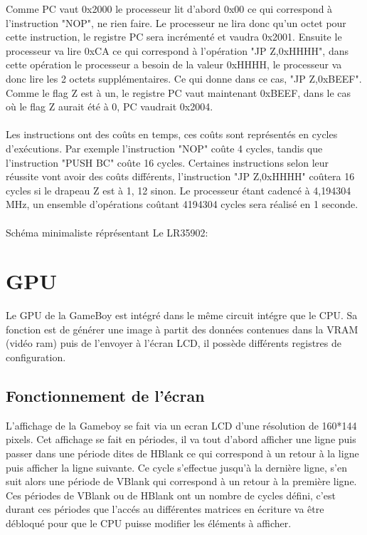 \documentclass{report}
\begin{document}
Comme PC vaut 0x2000 le processeur lit d'abord 0x00 ce qui correspond à l'instruction "NOP", ne rien faire. 
Le processeur ne lira donc qu'un octet pour cette instruction, le registre PC sera incrémenté et vaudra 0x2001.
Ensuite le processeur va lire 0xCA ce qui correspond à l'opération "JP Z,0xHHHH", dans cette opération le processeur a besoin de la valeur 0xHHHH, le processeur va donc lire les 2 octets supplémentaires. Ce qui donne dans ce cas, "JP Z,0xBEEF".
Comme le flag Z est à un, le registre PC vaut maintenant 0xBEEF, dans le cas où le flag Z aurait été à 0, PC vaudrait 0x2004.\\\\
Les instructions ont des coûts en temps, ces coûts sont représentés en cycles d'exécutions.
Par exemple l'instruction "NOP" coûte 4 cycles, tandis que l'instruction "PUSH BC" coûte 16 cycles.
Certaines instructions selon leur réussite vont avoir des coûts différents, l'instruction "JP Z,0xHHHH" coûtera 16 cycles si le drapeau Z est à 1, 12 sinon.
Le processeur étant cadencé à 4,194304 MHz, un ensemble d'opérations coûtant 4194304 cycles sera réalisé en 1 seconde.
\\\\
Schéma minimaliste réprésentant Le LR35902:

\section{GPU}

Le GPU de la GameBoy est intégré dans le même circuit intégre que le CPU. Sa fonction est de générer une image à partit des données contenues dans la VRAM (vidéo ram) puis de l'envoyer à l'écran LCD, il possède différents registres de configuration.

\subsection{Fonctionnement de l'écran}

L'affichage de la Gameboy se fait via un ecran LCD d'une résolution de 160*144 pixels. Cet affichage se fait en périodes, il va tout d'abord afficher une ligne puis passer dans une période dites de HBlank ce qui correspond à un retour à la ligne puis afficher la ligne suivante. Ce cycle s'effectue jusqu'à la dernière ligne, s'en suit alors une période de VBlank qui correspond à un retour à la première ligne.
Ces périodes de VBlank ou de HBlank ont un nombre de cycles défini, c'est
durant ces périodes que l'accés au différentes matrices en écriture va être
débloqué pour que le CPU puisse modifier les éléments à afficher.\\
\end{document}
